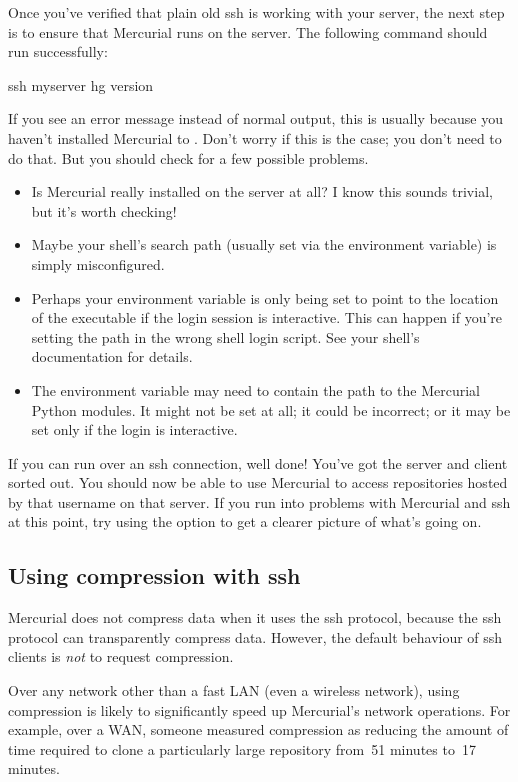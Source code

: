 Once you've verified that plain old ssh is working with your server,
the next step is to ensure that Mercurial runs on the server.  The
following command should run successfully:
\begin{codesample2}
  ssh myserver hg version
\end{codesample2}
If you see an error message instead of normal  output,
this is usually because you haven't installed Mercurial to
.  Don't worry if this is the case; you don't need
to do that.  But you should check for a few possible problems.
\begin{itemize}
\item Is Mercurial really installed on the server at all?  I know this
  sounds trivial, but it's worth checking!
\item Maybe your shell's search path (usually set via the 
  environment variable) is simply misconfigured.
\item Perhaps your  environment variable is only being set
  to point to the location of the  executable if the login
  session is interactive.  This can happen if you're setting the path
  in the wrong shell login script.  See your shell's documentation for
  details.
\item The  environment variable may need to contain
  the path to the Mercurial Python modules.  It might not be set at
  all; it could be incorrect; or it may be set only if the login is
  interactive.
\end{itemize}

If you can run  over an ssh connection, well done!
You've got the server and client sorted out.  You should now be able
to use Mercurial to access repositories hosted by that username on
that server.  If you run into problems with Mercurial and ssh at this
point, try using the  option to get a clearer picture
of what's going on.

\subsection{Using compression with ssh}

Mercurial does not compress data when it uses the ssh protocol,
because the ssh protocol can transparently compress data.  However,
the default behaviour of ssh clients is \emph{not} to request
compression.

Over any network other than a fast LAN (even a wireless network),
using compression is likely to significantly speed up Mercurial's
network operations.  For example, over a WAN, someone measured
compression as reducing the amount of time required to clone a
particularly large repository from~51 minutes to~17 minutes.

